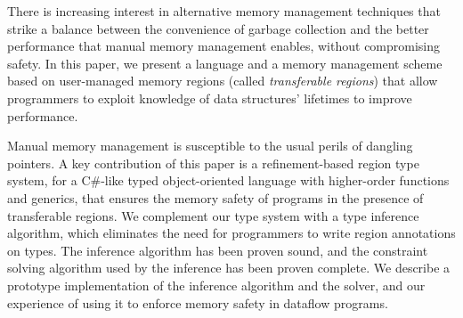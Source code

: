 %
There is increasing interest in alternative memory management techniques
that strike a balance between the convenience of garbage collection and
the better performance that manual memory management enables, without
compromising safety.
%
In this paper, we present a language and a memory management scheme based
on user-managed memory regions (called \emph{transferable regions})
that allow programmers to exploit knowledge of data structures' lifetimes
to improve performance.

Manual memory management is susceptible to the usual perils of
dangling pointers. A key contribution of this paper is a
refinement-based region type system, for a C\#-like typed
object-oriented language with higher-order functions and generics,
that ensures the memory safety of programs in the presence of
transferable regions.  We complement our type system with a type
inference algorithm, which eliminates the need for programmers to
write region annotations on types.
The inference algorithm has been proven sound, and the constraint
solving algorithm used by the inference has been proven complete.  We
describe a prototype implementation of the inference algorithm and the
solver, and our experience of using it to enforce memory safety in
dataflow programs.


